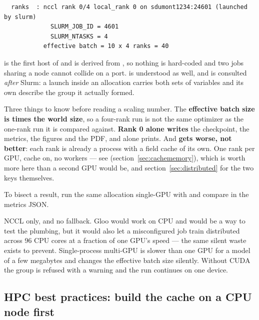 \begin{lstlisting}
  ranks  : nccl rank 0/4 local_rank 0 on sdumont1234:24601 (launched by slurm)
             SLURM_JOB_ID = 4601
             SLURM_NTASKS = 4
           effective batch = 10 x 4 ranks = 40
\end{lstlisting}

 is the first host of  and
 is derived from , so nothing is
hard-coded and two jobs sharing a node cannot collide on a port.
 is understood as well, and is consulted \emph{after} Slurm: a
 launch inside an allocation carries both sets of variables and
its own describe the group it actually formed.

Three things to know before reading a scaling number. The \textbf{effective
batch size is  times the world size}, so a four-rank run is
not the same optimizer as the one-rank run it is compared against. \textbf{Rank
0 alone writes} the checkpoint, the metrics, the figures and the PDF, and alone
prints. And \textbf{ gets worse, not better}: each rank is
already a process with a field cache of its own. One rank per GPU, cache on, no
workers --- see  (section~\ref{sec:cachememory}),
which is worth more here than a second GPU would be, and
section~\ref{sec:distributed} for the two keys themselves.

To bisect a result, run the same allocation single-GPU with
 and compare  in the metrics
JSON.

\begin{pnote}
NCCL only, and no  fallback. Gloo would work on CPU and would
be a way to test the plumbing, but it would also let a misconfigured job train
distributed across 96 CPU cores at a fraction of one GPU's speed --- the same
silent waste  exists to prevent. Single-process multi-GPU
is slower than one GPU for a model of a few megabytes and changes the effective
batch size silently. Without CUDA the group is refused with a warning and the
run continues on one device.
\end{pnote}

\subsection{HPC best practices: build the cache on a CPU node first}
\label{sec:cacheonly}

